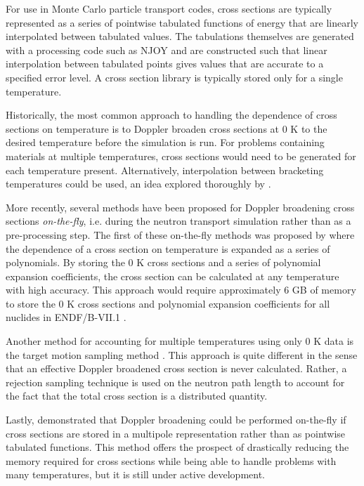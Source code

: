 \documentclass[3p,authoryear]{elsarticle}
\begin{document}
For use in Monte Carlo particle transport codes, cross sections are typically
represented as a series of pointwise tabulated functions of energy that are
linearly interpolated between tabulated values. The tabulations themselves are
generated with a processing code such as NJOY and are constructed such that
linear interpolation between tabulated points gives values that are accurate to
a specified error level. A cross section library is typically stored only for a
single temperature.

Historically, the most common approach to handling the dependence of cross
sections on temperature is to Doppler broaden cross sections at 0 K to the
desired temperature before the simulation is run. For problems containing
materials at multiple temperatures, cross sections would need to be generated
for each temperature present. Alternatively, interpolation between bracketing
temperatures could be used, an idea explored thoroughly by
\citet{nse-trumbull-2006}.

More recently, several methods have been proposed for Doppler broadening cross
sections \textit{on-the-fly}, i.e. during the neutron transport simulation
rather than as a pre-processing step. The first of these on-the-fly methods was
proposed by \citet{nse-yesilyurt-2012} where the dependence of a cross section
on temperature is expanded as a series of polynomials. By storing the 0 K cross
sections and a series of polynomial expansion coefficients, the cross section
can be calculated at any temperature with high accuracy. This approach would
require approximately 6 GB of memory to store the 0 K cross sections and
polynomial expansion coefficients for all nuclides in ENDF/B-VII.1
\citep{snamc-brown-2013}.

Another method for accounting for multiple temperatures using only 0 K data is
the target motion sampling method \citep{nse-viitanen-2012}. This approach is
quite different in the sense that an effective Doppler broadened cross section
is never calculated. Rather, a rejection sampling technique is used on the
neutron path length to account for the fact that the total cross section is a
distributed quantity.

Lastly, \citet{ane-forget-2014} demonstrated that Doppler broadening could be
performed on-the-fly if cross sections are stored in a multipole representation
rather than as pointwise tabulated functions. This method offers the prospect of
drastically reducing the memory required for cross sections while being able to
handle problems with many temperatures, but it is still under active
development.
\end{document}

